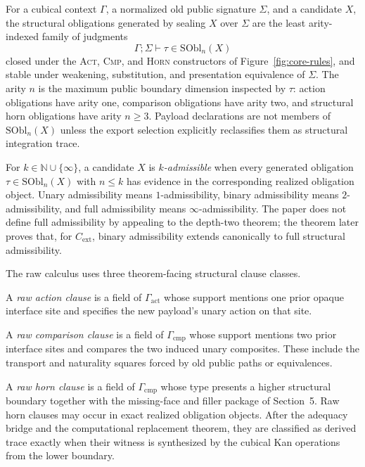 \documentclass{lmcs}
\newcommand{\SObl}{\mathrm{SObl}}
\newcommand{\Cext}{C_{\mathrm{ext}}}
\begin{document}
\begin{defi}
\label{def:generated-structural-obligations}
For a cubical context \(\Gamma\), a normalized old public signature \(\Sigma\), and a
candidate \(X\), the structural obligations generated by sealing \(X\) over
\(\Sigma\) are the least arity-indexed family of judgments
\[
  \Gamma;\Sigma\vdash \tau\in\SObl_n(X)
\]
closed under the \textsc{Act}, \textsc{Cmp}, and \textsc{Horn} constructors of
Figure~\ref{fig:core-rules}, and stable under weakening, substitution, and
presentation equivalence of \(\Sigma\).  The arity \(n\) is the maximum public
boundary dimension inspected by \(\tau\): action obligations have arity one,
comparison obligations have arity two, and structural horn obligations have
arity \(n\geq 3\).  Payload declarations are not members of \(\SObl_n(X)\)
unless the export selection explicitly reclassifies them as structural
integration trace.
\end{defi}

\begin{defi}
\label{def:depth-indexed-admissibility}
For \(k\in\mathbb N\cup\{\infty\}\), a candidate \(X\) is
\emph{\(k\)-admissible} when every generated obligation
\(\tau\in\SObl_n(X)\) with \(n\leq k\) has evidence in the corresponding
realized obligation object.  Unary admissibility means \(1\)-admissibility,
binary admissibility means \(2\)-admissibility, and full admissibility means
\(\infty\)-admissibility.  The paper does not define full admissibility by
appealing to the depth-two theorem; the theorem later proves that, for
\(\Cext\), binary admissibility extends canonically to full structural
admissibility.
\end{defi}

\begin{defi}
The raw calculus uses three theorem-facing structural clause classes.

A \emph{raw action clause} is a field of \(\Gamma_{\mathrm{act}}\) whose support mentions one
prior opaque interface site and specifies the new payload's unary action on that site.

A \emph{raw comparison clause} is a field of \(\Gamma_{\mathrm{cmp}}\) whose support mentions
two prior interface sites and compares the two induced unary composites.  These include the
transport and naturality squares forced by old public paths or equivalences.

A \emph{raw horn clause} is a field of \(\Gamma_{\mathrm{cmp}}\) whose type presents a higher
structural boundary together with the missing-face and filler package of Section~5.  Raw horn
clauses may occur in exact realized obligation objects.  After the adequacy bridge and the
computational replacement theorem, they are classified as derived trace exactly when their
witness is synthesized by the cubical Kan operations from the lower boundary.
\end{defi}
\end{document}
